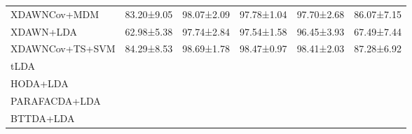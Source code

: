 \begin{tabularx}{\textwidth}{Xccccc}
XDAWNCov+MDM          & 83.20±9.05 & 98.07±2.09 & 97.78±1.04 & 97.70±2.68 & 86.07±7.15 \\
XDAWN+LDA             & 62.98±5.38 & 97.74±2.84 & 97.54±1.58 & 96.45±3.93 & 67.49±7.44 \\
XDAWNCov+TS+SVM       & 84.29±8.53 & 98.69±1.78 & 98.47±0.97 & 98.41±2.03 & 87.28±6.92 \\
tLDA                  & & & & & \\ \midrule
HODA+LDA                  & & & & &  \\
PARAFACDA+LDA             & & & & &  \\
BTTDA+LDA                 & & & & &  \\
\bottomrule
\end{tabularx}
